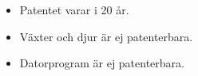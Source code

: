 \begin{itemize}
	\item Patentet varar i 20 år.
	\item Växter och djur är ej patenterbara.
	\item Datorprogram är ej patenterbara.
\end{itemize}	






